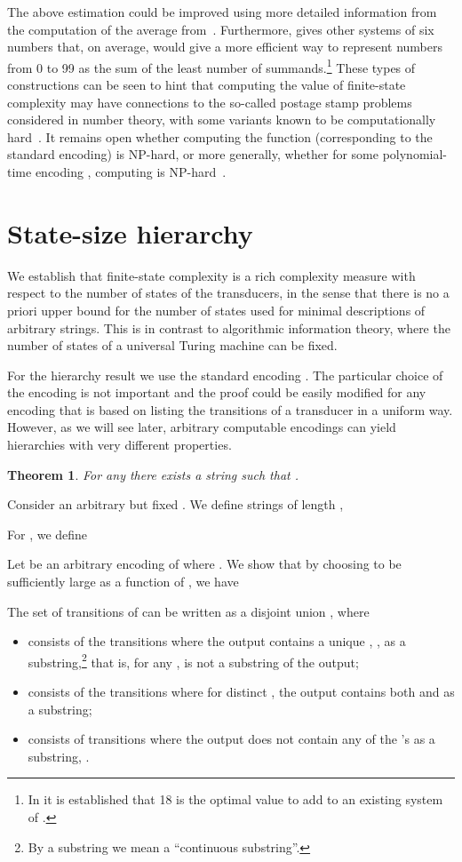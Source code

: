 \documentclass[copyright]{eptcs}
\def \proof{\bigbreak\noindent{\bf Proof.\ \ }}
\newtheorem{theorem}{T\/heorem}[section]
\begin{document}
The above estimation could 
be improved using more detailed information
from the computation of the average from~\cite{Sh}. Furthermore, 
\cite{Sh} gives other systems of six numbers that,
on average, would give a more efficient way to represent numbers from 0
to 99 as the sum of the least number
of summands.\footnote{In \cite{Sh} it is established
that 18 is the optimal value to add to an existing
system of .} These types of constructions
can be seen to hint that computing the value of finite-state complexity
may have connections to the so-called postage stamp problems considered
in number theory,
with some  variants known
to be computationally
hard~\cite{Gu,Sh2}. It remains open whether computing the function
 (corresponding to the standard encoding) is NP-hard, 
or more generally, whether for
some polynomial-time encoding , computing
 is NP-hard~\cite{CSR}.  

\section{State-size hierarchy }
\label{statessize}

We establish that finite-state complexity is a rich complexity measure
with respect to the number of states of the transducers, in the
sense that there is no a priori upper bound for the number of states
used for minimal descriptions of arbitrary strings.
This is in contrast to algorithmic information theory,
where the number of states of a
universal Turing machine can be fixed.

For the hierarchy result we use the standard encoding .
The particular choice of the 
encoding  is not important and the proof could be easily modified
for any encoding that is based on listing the transitions of
a transducer in a uniform way.
However, as we will see later, arbitrary computable encodings can yield
hierarchies with very different properties.


\begin{theorem}
\label{se-ketta}
For any  there exists a string
 such that .
\end{theorem}
\proof
Consider an arbitrary but fixed . 
We define  strings of length ,

For , we define


Let  be an arbitrary encoding of  where
.
We show that by choosing  to be sufficiently large as a function of
, we have


The set of transitions of  can be written
as a disjoint union ,
where
\begin{itemize}
\item  consists of the transitions where the output
contains a unique , , as a 
substring,\footnote{By a substring we mean a ``continuous
substring''.}
that is, for any ,  is not a substring of the output;
\item  consists of the transitions where for distinct
, the output contains both  and 
 as a substring;
\item  consists of transitions where the output
does not contain any of the 's as a substring,
.
\end{itemize}
\end{document}
